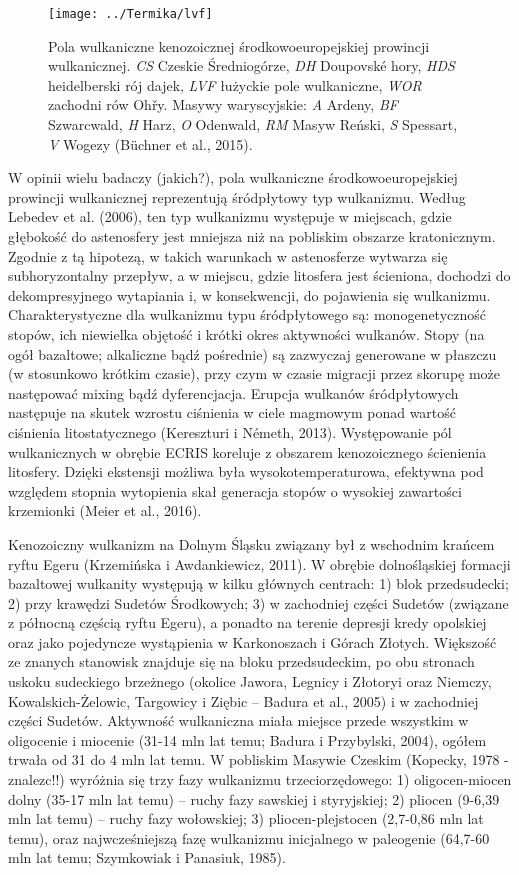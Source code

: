 \documentclass[11.5pt,twoside]{report}
\begin{document}
\begin{figure}[h]
	\centering
	\texttt{[image: ../Termika/lvf]}
	\caption{Pola wulkaniczne kenozoicznej środkowoeuropejskiej prowincji wulkanicznej. \textit{CS} Czeskie Średniogórze, \textit{DH} Doupovsk\'{e} hory, \textit{HDS} heidelberski rój dajek, \textit{LVF} łużyckie pole wulkaniczne, \textit{WOR} zachodni rów Oh\v{r}y. Masywy waryscyjskie: \textit{A} Ardeny, \textit{BF} Szwarcwald, \textit{H} Harz, \textit{O} Odenwald, \textit{RM} Masyw Reński, \textit{S} Spessart, \textit{V} Wogezy (B\"{u}chner et al., 2015).} 
	\label{Fig.}
\end{figure}

W opinii wielu badaczy (jakich?), pola wulkaniczne środkowoeuropejskiej prowincji wulkanicznej reprezentują śródpłytowy typ wulkanizmu. Według Lebedev et al. (2006), ten typ wulkanizmu występuje w miejscach, gdzie głębokość do astenosfery jest mniejsza niż na pobliskim obszarze kratonicznym. Zgodnie z tą hipotezą, w takich warunkach w astenosferze wytwarza się subhoryzontalny przepływ, a w miejscu, gdzie litosfera jest ścieniona, dochodzi do dekompresyjnego wytapiania i, w konsekwencji, do pojawienia się wulkanizmu. Charakterystyczne dla wulkanizmu typu śródpłytowego są: monogenetyczność stopów, ich niewielka objętość i krótki okres aktywności wulkanów. Stopy (na ogół bazaltowe; alkaliczne bąd\'{z} pośrednie) są zazwyczaj generowane w płaszczu (w stosunkowo krótkim czasie), przy czym w czasie migracji przez skorupę może następować mixing bąd\'{z} dyferencjacja. Erupcja wulkanów śródpłytowych następuje na skutek wzrostu ciśnienia w ciele magmowym ponad wartość ciśnienia litostatycznego (Kereszturi i Németh, 2013). Występowanie pól wulkanicznych w obrębie ECRIS koreluje z obszarem kenozoicznego ścienienia litosfery. Dzięki ekstensji możliwa była wysokotemperaturowa, efektywna pod względem stopnia wytopienia skał generacja stopów o wysokiej zawartości krzemionki (Meier et al., 2016).

Kenozoiczny wulkanizm na Dolnym Śląsku związany był z wschodnim krańcem ryftu Egeru (Krzemińska i Awdankiewicz, 2011). W obrębie dolnośląskiej formacji bazaltowej wulkanity występują w kilku głównych centrach: 1) blok przedsudecki; 2) przy krawędzi Sudetów Środkowych; 3) w zachodniej części Sudetów (związane z północną częścią ryftu Egeru), a ponadto na terenie depresji kredy opolskiej oraz jako pojedyncze wystąpienia w Karkonoszach i Górach Złotych. Większość ze znanych stanowisk znajduje się na bloku przedsudeckim, po obu stronach uskoku sudeckiego brzeżnego (okolice Jawora, Legnicy i Złotoryi oraz Niemczy, Kowalskich-Żelowic, Targowicy i Ziębic -- Badura et al., 2005) i w zachodniej części Sudetów. Aktywność wulkaniczna miała miejsce przede wszystkim w oligocenie i miocenie (31-14 mln lat temu; Badura i Przybylski, 2004), ogółem trwała od 31 do 4 mln lat temu. W pobliskim Masywie Czeskim (Kopecky, 1978 - znalezc!!) wyróżnia się trzy fazy wulkanizmu trzeciorzędowego: 1) oligocen-miocen dolny (35-17 mln lat temu) -- ruchy fazy sawskiej i styryjskiej; 2) pliocen (9-6,39 mln lat temu) -- ruchy fazy wołowskiej; 3) pliocen-plejstocen (2,7-0,86 mln lat temu), oraz najwcześniejszą fazę wulkanizmu inicjalnego w paleogenie (64,7-60 mln lat temu; Szymkowiak i Panasiuk, 1985).
\end{document}
